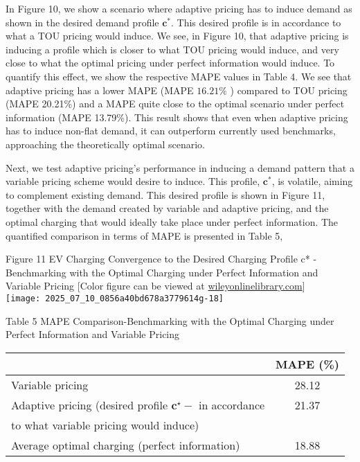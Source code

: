 \documentclass[10pt]{article}
\begin{document}
In Figure 10, we show a scenario where adaptive pricing has to induce demand as shown in the desired demand profile $\mathbf{c}^{*}$. This desired profile is in accordance to what a TOU pricing would induce. We see, in Figure 10, that adaptive pricing is inducing a profile which is closer to what TOU pricing would induce, and very close to what the optimal pricing under perfect information would induce. To quantify this effect, we show the respective MAPE values in Table 4. We see that adaptive pricing has a lower MAPE (MAPE $16.21 \%$ ) compared to TOU pricing (MAPE 20.21\%) and a MAPE quite close to the optimal scenario under perfect information (MAPE 13.79\%). This result shows that even when adaptive pricing has to induce non-flat demand, it can outperform currently used benchmarks, approaching the theoretically optimal scenario.

Next, we test adaptive pricing's performance in inducing a demand pattern that a variable pricing scheme would desire to induce. This profile, $\mathbf{c}^{*}$, is volatile, aiming to complement existing demand. This desired profile is shown in Figure 11, together with the demand created by variable and adaptive pricing, and the optimal charging that would ideally take place under perfect information. The quantified comparison in terms of MAPE is presented in Table 5,

Figure 11 EV Charging Convergence to the Desired Charging Profile c* - Benchmarking with the Optimal Charging under Perfect Information and Variable Pricing [Color figure can be viewed at \href{http://wileyonlinelibrary.com}{wileyonlinelibrary.com}]\\
\texttt{[image: 2025\_07\_10\_0856a40bd678a3779614g-18]}

Table 5 MAPE Comparison-Benchmarking with the Optimal Charging under Perfect Information and Variable Pricing

\begin{center}
\begin{tabular}{lc}
\hline
 & MAPE (\%) \\
\hline
Variable pricing & 28.12 \\
Adaptive pricing (desired profile $\mathbf{c}^{\star}-$ in accordance & 21.37 \\
to what variable pricing would induce) &  \\
Average optimal charging (perfect information) & 18.88 \\
\hline
\end{tabular}
\end{center}
\end{document}
